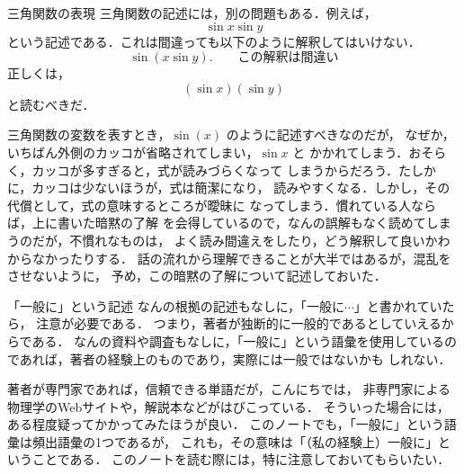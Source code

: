\begin{preattention}{三角関数の表現}
        三角関数の記述には，別の問題もある．例えば，
            \begin{equation*}
                \sin x \sin y
            \end{equation*}
        という記述である．これは間違っても以下のように解釈してはいけない．
            \begin{equation*}
                \sin(x \sin y). \qquad \mbox{この解釈は間違い}
            \end{equation*}
        正しくは，
            \begin{equation*}
                (\sin x)(\sin y)
            \end{equation*}
        と読むべきだ．

        三角関数の変数を表すとき，$\sin(x)$ のように記述すべきなのだが，
        なぜか，いちばん外側のカッコが省略されてしまい，$\sin x$ と
        かかれてしまう．おそらく，カッコが多すぎると，式が読みづらくなって
        しまうからだろう．たしかに，カッコは少ないほうが，式は簡潔になり，
        読みやすくなる．しかし，その代償として，式の意味するところが曖昧に
        なってしまう．慣れている人ならば，上に書いた暗黙の了解
        を会得しているので，なんの誤解もなく読めてしまうのだが，不慣れなものは，
        よく読み間違えをしたり，どう解釈して良いかわからなかったりする．
        話の流れから理解できることが大半ではあるが，混乱をさせないように，
        予め，この暗黙の了解について記述しておいた．
    \end{preattention}


    \begin{preattention}{「一般に」という記述}
        なんの根拠の記述もなしに，「一般に$\cdots$」と書かれていたら，
        注意が必要である．
        つまり，著者が独断的に一般的であるとしていえるからである．
        なんの資料や調査もなしに，「一般に」という語彙を使用しているの
        であれば，著者の経験上のものであり，実際には一般ではないかも
        しれない．

        著者が専門家であれば，信頼できる単語だが，こんにちでは，
        非専門家による物理学のWebサイトや，解説本などがはびこっている．
        そういった場合には，ある程度疑ってかかってみたほうが良い．
        このノートでも，「一般に」という語彙は頻出語彙の1つであるが，
        これも，その意味は「（私の経験上）一般に」ということである．
        このノートを読む際には，特に注意しておいてもらいたい．
    \end{preattention}